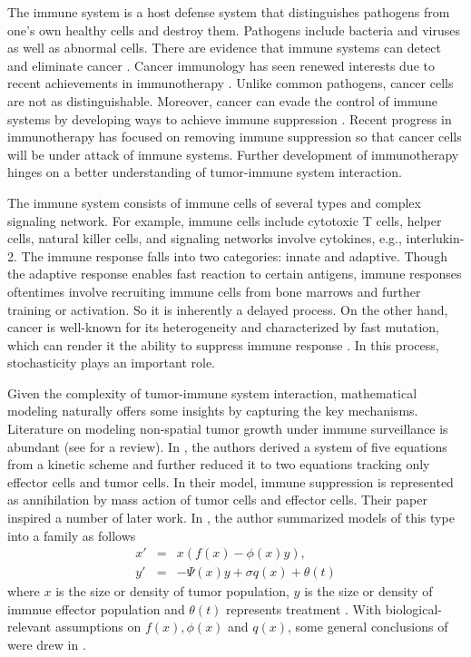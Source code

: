 \documentclass{aims}
\theoremstyle{definition}
\begin{document}
The immune system is a host defense system that distinguishes pathogens from one's own healthy cells and destroy them. Pathogens include bacteria and viruses as well as abnormal cells. There are evidence that immune systems can detect and eliminate cancer \cite{parish2003cancer}. Cancer immunology has seen renewed interests due to recent achievements in immunotherapy \cite{mahoney2015next}. Unlike common pathogens, cancer cells are not as distinguishable. Moreover, cancer can evade the control of immune systems by developing ways to achieve immune suppression \cite{Whiteside2006}. Recent progress in immunotherapy has focused on removing immune suppression so that cancer cells will be under attack of immune systems. Further development of immunotherapy hinges on a better understanding of tumor-immune system interaction. 

The immune system consists of immune cells of several types and complex
signaling network. For example, immune cells include cytotoxic T cells,
helper cells, natural killer cells, and signaling networks involve
cytokines, e.g., interlukin-2. The immune response falls into two
categories: innate and adaptive. Though the adaptive response enables
fast reaction to certain antigens, immune responses oftentimes involve
recruiting immune cells from bone marrows and further training or
activation. So it is inherently a delayed process. On the other hand,
cancer is well-known for its heterogeneity and characterized by fast
mutation, which can render it the ability to suppress immune response
\cite{fisher2013cancer,Whiteside2006}. In this process, stochasticity
plays an important role. 

Given the complexity of tumor-immune system interaction, mathematical
modeling naturally offers some insights by capturing the key mechanisms.
Literature on modeling non-spatial tumor growth under immune surveillance
is abundant (see \cite{Eftimie2011} for a review). In \cite{Kuznetsov1994},
the authors derived a system of five equations from a kinetic scheme
and further reduced it to two equations tracking only effector cells
and tumor cells. In their model, immune suppression is represented
as annihilation by mass action of tumor cells and effector cells.
Their paper inspired a number of later work. In \cite{dOnofrio2008},
the author summarized models of this type into a family as follows\begin{subequations}\label{eq: dOnofrio}
\begin{eqnarray}
x' & = & x(f(x)-\phi(x)y),\\
y' & = & -\Psi(x)y+\sigma q(x)+\theta(t)
\end{eqnarray}
\end{subequations} where $x$ is the size or density of tumor population,
$y$ is the size or density of immnue effector population and $\theta(t)$
represents treatment . With biological-relevant assumptions on $f(x),\phi(x)$
and $q(x)$, some general conclusions of were drew in \cite{dOnofrio2008}. 
\end{document}
